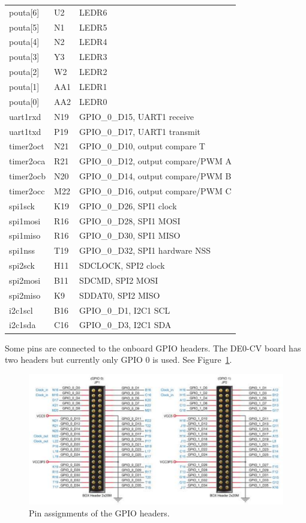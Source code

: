 \documentclass[12pt]{article}
\begin{document}
\begin{longtable}{lll}
pouta[6]  & U2       & LEDR6 \\
pouta[5]  & N1       & LEDR5 \\
pouta[4]  & N2       & LEDR4 \\
pouta[3]  & Y3       & LEDR3 \\
pouta[2]  & W2       & LEDR2 \\
pouta[1]  & AA1      & LEDR1 \\
pouta[0]  & AA2      & LEDR0 \\
uart1rxd  & N19      & GPIO\_0\_D15, UART1 receive \\
uart1txd  & P19      & GPIO\_0\_D17, UART1 transmit  \\
timer2oct & N21      & GPIO\_0\_D10, output compare T \\
timer2oca & R21      & GPIO\_0\_D12, output compare/PWM A \\
timer2ocb & N20      & GPIO\_0\_D14, output compare/PWM B \\
timer2occ & M22      & GPIO\_0\_D16, output compare/PWM C \\
spi1sck   & K19      & GPIO\_0\_D26, SPI1 clock \\
spi1mosi  & R16      & GPIO\_0\_D28, SPI1 MOSI \\
spi1miso  & R16      & GPIO\_0\_D30, SPI1 MISO \\
spi1nss   & T19      & GPIO\_0\_D32, SPI1 hardware NSS \\
spi2sck   & H11      & SDCLOCK, SPI2 clock \\
spi2mosi  & B11      & SDCMD, SPI2 MOSI \\
spi2miso  & K9       & SDDAT0, SPI2 MISO \\
i2c1scl   & B16      & GPIO\_0\_D1, I2C1 SCL \\
i2c1sda   & C16      & GPIO\_0\_D3, I2C1 SDA
\end{longtable}

Some pins are connected to the onboard GPIO headers. The DE0-CV board has two headers but currently only GPIO 0 is used. See Figure~\ref{fig:de0-cv-gpio}.

\begin{figure}[!ht]
\centering
\includegraphics[scale=0.63]{images/de0-cv-gpio}
\caption{Pin assignments of the GPIO headers.}
\label{fig:de0-cv-gpio}
\end{figure}
\end{document}
